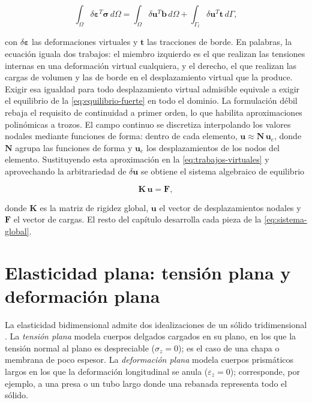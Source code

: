 \begin{equation}
\int_\Omega \delta\bm{\varepsilon}^{T} \bm{\sigma} \, d\Omega
= \int_\Omega \delta\bm{u}^{T} \bm{b} \, d\Omega
+ \int_{\Gamma_t} \delta\bm{u}^{T} \bm{t} \, d\Gamma,
\label{eq:trabajos-virtuales}
\end{equation}

con $\delta\bm{\varepsilon}$ las deformaciones virtuales y $\bm{t}$ las tracciones de borde. En palabras, la ecuación iguala dos trabajos: el miembro izquierdo es el que realizan las tensiones internas en una deformación virtual cualquiera, y el derecho, el que realizan las cargas de volumen y las de borde en el desplazamiento virtual que la produce. Exigir esa igualdad para todo desplazamiento virtual admisible equivale a exigir el equilibrio de la \autoref{eq:equilibrio-fuerte} en todo el dominio. La formulación débil rebaja el requisito de continuidad a primer orden, lo que habilita aproximaciones polinómicas a trozos. El campo continuo se discretiza interpolando los valores nodales mediante funciones de forma: dentro de cada elemento, $\bm{u} \approx \bm{N}\,\bm{u}_e$, donde $\bm{N}$ agrupa las funciones de forma y $\bm{u}_e$ los desplazamientos de los nodos del elemento. Sustituyendo esta aproximación en la \autoref{eq:trabajos-virtuales} y aprovechando la arbitrariedad de $\delta\bm{u}$ se obtiene el sistema algebraico de equilibrio

\begin{equation}
\bm{K}\,\bm{u} = \bm{F},
\label{eq:sistema-global}
\end{equation}

donde $\bm{K}$ es la matriz de rigidez global, $\bm{u}$ el vector de desplazamientos nodales y $\bm{F}$ el vector de cargas. El resto del capítulo desarrolla cada pieza de la \autoref{eq:sistema-global}.

\section{Elasticidad plana: tensión plana y deformación plana}
\label{sec:elasticidad-plana}

La elasticidad bidimensional admite dos idealizaciones de un sólido tridimensional \autocites[pp.~11-12]{timoshenko1970elasticity}[pp.~79, 94]{cook2002concepts}. La \emph{tensión plana} modela cuerpos delgados cargados en su plano, en los que la tensión normal al plano es despreciable ($\sigma_z = 0$); es el caso de una chapa o membrana de poco espesor. La \emph{deformación plana} modela cuerpos prismáticos largos en los que la deformación longitudinal se anula ($\varepsilon_z = 0$); corresponde, por ejemplo, a una presa o un tubo largo donde una rebanada representa todo el sólido.

